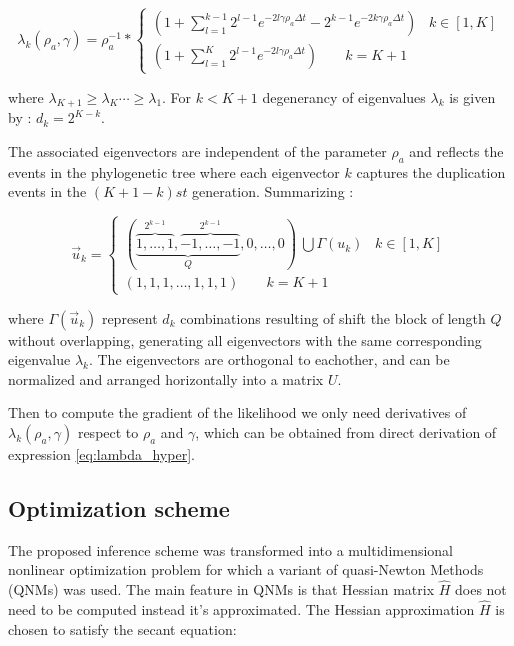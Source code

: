 \documentclass[preprint,amsmath,amssymb,superscriptaddress,showpacs,pre]{revtex4-1}
\begin{document}
\begin{equation}
\label{eq:lambda_hyper}
\lambda_k(\rho_a,\gamma) =\rho^{-1}_a *
\begin{cases}
 (1+\sum_{l=1}^{k-1} 2^{l-1} e ^{-2l\gamma\rho_a\Delta t}-2^{k-1} e ^{-2k\gamma\rho_a\Delta t})\;\;\; k\in[1,K] \\
 (1+\sum_{l=1}^{K} 2^{l-1} e ^{-2l\gamma\rho_a\Delta t}) \;\;\;\;\;\;\;k=K+1
\end{cases}
\end{equation}

where $\lambda_{K+1}\ge\lambda_{K}\cdots\ge\lambda_{1}$. For $k<K+1$ degenerancy of eigenvalues $\lambda_k$ is given by : $d_k=2^{K-k}$.  

The associated eigenvectors are independent of the parameter $\rho_a$ and reflects the events in the phylogenetic tree  where each eigenvector  $k$ captures the duplication events in the $(K+1 -k) 	st$ generation. Summarizing :

\begin{equation} 
\nonumber
 \vec{u}_k =
\begin{cases}
{(\underbrace{\overbrace{1,\ldots,1}^{2^{k-1}},\overbrace{-1,\ldots,-1}^{2^{k-1}}}_Q,0,\ldots,0)\ \bigcup \Gamma(u_k) } \;\;\; k\in[1,K] \\
(1,1,1,\ldots,1,1,1)\;\;\;\;\;\;\;k=K+1
\label{eq:eigenvec_simpler_case}
\end{cases}	
\end{equation}

where $\Gamma(\vec{u}_k )$ represent $d_k$ combinations resulting of shift the block of length $Q$ without overlapping, generating all eigenvectors with the same corresponding eigenvalue $\lambda_k$.  The eigenvectors are orthogonal to eachother, and can be  normalized and arranged horizontally into a matrix $U$. 

Then to compute the gradient of the likelihood we only need  derivatives of $\lambda_k(\rho_a,\gamma)$  respect to $\rho_a$ and $\gamma$, which can be obtained from direct derivation of expression \ref{eq:lambda_hyper}.


\subsection{Optimization scheme}
\label{sub:optimization_scheme}

The proposed inference scheme was transformed into a multidimensional nonlinear optimization problem for which a variant  of quasi-Newton Methods (QNMs) was used.  The main feature in QNMs is that Hessian matrix $\hat{H}$  does not need to be computed instead it’s approximated. The Hessian approximation $\hat{H}$ is chosen to satisfy the secant equation:
\end{document}
